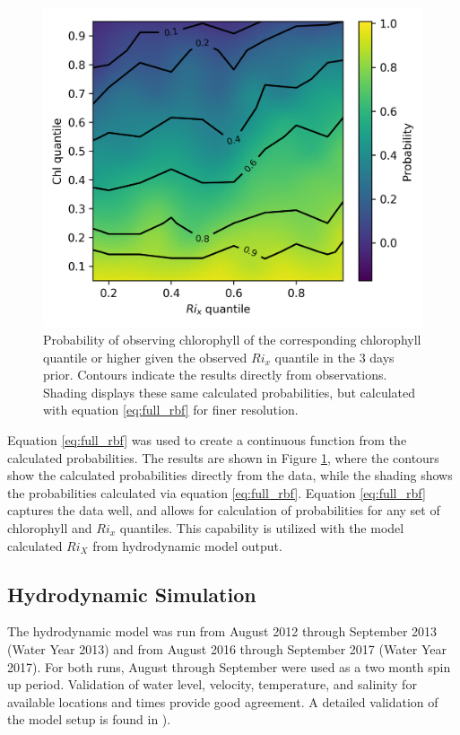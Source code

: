 \documentclass[preprint,review,12pt]{elsarticle}
\begin{document}
\begin{figure}[ht!]
\centering
\includegraphics[width=\textwidth]{Figures/chl_rix_rbf_pdf.png}
\caption{Probability of observing chlorophyll of the corresponding chlorophyll quantile or higher given the observed \(Ri_x\) quantile in the 3 days prior. Contours indicate the results directly from observations. Shading displays these same calculated probabilities, but calculated with equation \ref{eq:full_rbf} for finer resolution.}
\label{fig:chl_pdf}
\end{figure}
\FloatBarrier

Equation \ref{eq:full_rbf} was used to create a continuous function from the calculated probabilities. The results are shown in Figure \ref{fig:chl_pdf}, where the contours show the calculated probabilities directly from the data, while the shading shows the probabilities calculated via equation \ref{eq:full_rbf}. Equation \ref{eq:full_rbf} captures the data well, and allows for calculation of probabilities for any set of chlorophyll and \(Ri_x\) quantiles. This capability is utilized with the model calculated \(Ri_X\) from hydrodynamic model output. 

\subsection{Hydrodynamic Simulation}
The hydrodynamic model was run from August 2012 through September 2013 (Water Year 2013) and from August 2016 through September 2017 (Water Year 2017). For both runs, August through September were used as a two month spin up period. Validation of water level, velocity, temperature, and salinity for available locations and times provide good agreement. A detailed validation of the model setup is found in \cite{holleman2017}). 
\end{document}
